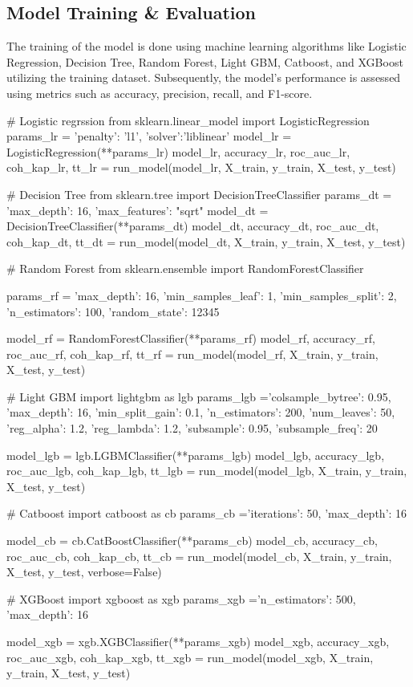 \documentclass{josis}
\begin{document}
\subsection{Model Training \& Evaluation}
The training of the model is done using machine learning algorithms like Logistic Regression, Decision Tree, Random Forest, Light GBM, Catboost, and XGBoost utilizing the training dataset. Subsequently, the model's performance is assessed using metrics such as accuracy, precision, recall, and F1-score.
\begin{python}
# Logistic regrssion
from sklearn.linear_model import LogisticRegression
params_lr = {'penalty': 'l1', 'solver':'liblinear'}
model_lr = LogisticRegression(**params_lr)
model_lr, accuracy_lr, roc_auc_lr, coh_kap_lr, tt_lr = run_model(model_lr, X_train, y_train, X_test, y_test)

 
# Decision Tree
from sklearn.tree import DecisionTreeClassifier
params_dt = {'max_depth': 16,
             'max_features': "sqrt"}
model_dt = DecisionTreeClassifier(**params_dt)
model_dt, accuracy_dt, roc_auc_dt, coh_kap_dt, tt_dt = run_model(model_dt, X_train, y_train, X_test, y_test)

# Random Forest
from sklearn.ensemble import RandomForestClassifier

params_rf = {'max_depth': 16,
             'min_samples_leaf': 1,
             'min_samples_split': 2,
             'n_estimators': 100,
             'random_state': 12345}

model_rf = RandomForestClassifier(**params_rf)
model_rf, accuracy_rf, roc_auc_rf, coh_kap_rf, tt_rf = run_model(model_rf, X_train, y_train, X_test, y_test)

# Light GBM
import lightgbm as lgb
params_lgb ={'colsample_bytree': 0.95, 
         'max_depth': 16, 
         'min_split_gain': 0.1, 
         'n_estimators': 200, 
         'num_leaves': 50, 
         'reg_alpha': 1.2, 
         'reg_lambda': 1.2, 
         'subsample': 0.95, 
         'subsample_freq': 20}

model_lgb = lgb.LGBMClassifier(**params_lgb)
model_lgb, accuracy_lgb, roc_auc_lgb, coh_kap_lgb, tt_lgb = run_model(model_lgb, X_train, y_train, X_test, y_test)

# Catboost
import catboost as cb
params_cb ={'iterations': 50,
            'max_depth': 16}

model_cb = cb.CatBoostClassifier(**params_cb)
model_cb, accuracy_cb, roc_auc_cb, coh_kap_cb, tt_cb = run_model(model_cb, X_train, y_train, X_test, y_test, verbose=False)

# XGBoost
import xgboost as xgb
params_xgb ={'n_estimators': 500,
            'max_depth': 16}

model_xgb = xgb.XGBClassifier(**params_xgb)
model_xgb, accuracy_xgb, roc_auc_xgb, coh_kap_xgb, tt_xgb = run_model(model_xgb, X_train, y_train, X_test, y_test)
\end{python}
\end{document}
